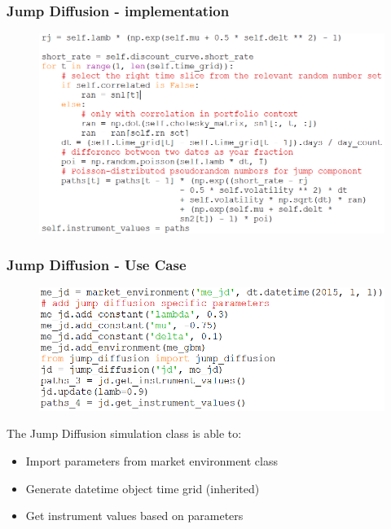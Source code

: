 \documentclass{beamer}
\begin{document}
\begin{frame}
\frametitle{Jump Diffusion - implementation}
\begin{figure}[H]
	\includegraphics[scale=0.47]{jd_generate_path_2.png}
\end{figure}
\end{frame}

\begin{frame}
\frametitle{Jump Diffusion - Use Case}
\begin{figure}[H]
	\includegraphics[scale=0.45]{jd_use_case.png}
\end{figure}
The Jump Diffusion simulation class is able to:
\begin{itemize}
	\item Import parameters from market environment class
	\item Generate datetime object time grid (inherited)
	\item Get instrument values based on parameters
\end{itemize}
\end{frame}
\end{document}
